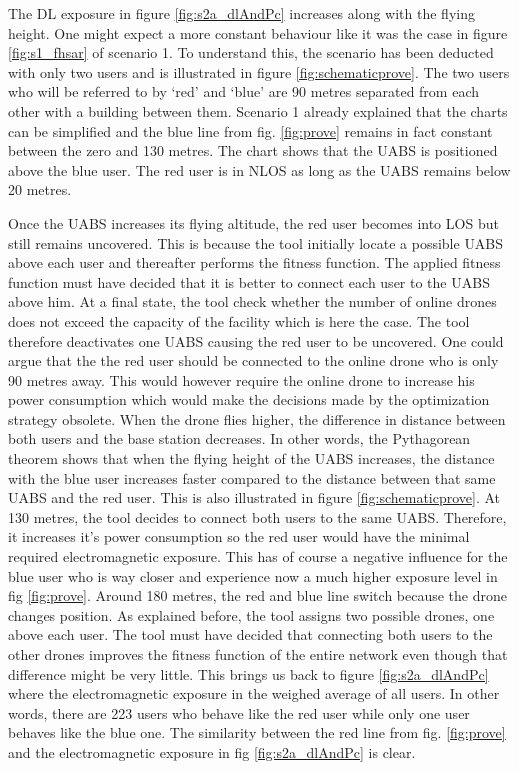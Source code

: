 The \gls{DL} exposure in figure \ref{fig:s2a_dlAndPc} increases along with the flying height. One might expect a more constant 
behaviour like it was the case in figure \ref{fig:s1_fhsar} of scenario 1. To understand this, the scenario has been deducted 
with only two users and is illustrated in figure \ref{fig:schematicprove}.
The two users who will be referred to by `red' and `blue' are 90 metres separated from each other with a building between them.
Scenario 1 already explained that the charts can be simplified and the blue line from fig. \ref{fig:prove} remains in fact constant between the zero and 130 metres.
The chart shows that the \gls{UABS} is positioned above the blue user. The red user is in \gls{NLOS} as long as the \gls{UABS} remains below 20 metres.

Once the \gls{UABS} increases its flying altitude, the red user becomes into \gls{LOS} but still remains uncovered. This is because the tool initially locate a possible 
\gls{UABS} above each user and thereafter performs the  fitness function. The applied fitness function must have decided that it is better to connect 
each user to the \gls{UABS} above him. At a final state, the tool check whether the number of online drones does not exceed the capacity of the facility
which is here the case. The tool therefore deactivates one \gls{UABS} causing the red user to be uncovered. One could argue that the 
the red user should be connected to the online drone who is only 90 metres away. This would however require the online drone to increase his power consumption which 
would make the decisions made by the optimization strategy obsolete.
When the drone flies higher, the difference in distance between both users and the base station decreases. In other words, the Pythagorean theorem shows that when the flying height of the 
\gls{UABS} increases, the distance with the blue user increases faster compared to the distance between that same \gls{UABS} and the red user. This is also illustrated in figure \ref{fig:schematicprove}.
At 130 metres, the tool decides to connect both users to the same \gls{UABS}. Therefore, it increases it's power consumption so the red user would  have the minimal 
required electromagnetic exposure. This has of course a negative influence for the blue user who is way closer and experience now a much higher exposure level in fig \ref{fig:prove}.
Around 180 metres, the  red and blue line switch because the drone changes position. As explained before, the tool assigns two possible drones, one above 
each user. The tool must have decided that connecting both users to the other drones improves the fitness function of the entire network even though that difference might be 
very little. This brings us back to figure \ref{fig:s2a_dlAndPc} where the electromagnetic exposure in the weighed average of all users. In other words, there are 223 users who behave like the  red user while only
one user behaves like the blue one. The similarity between the red line from fig. \ref{fig:prove}  and  the electromagnetic exposure in fig  \ref{fig:s2a_dlAndPc} is clear.

